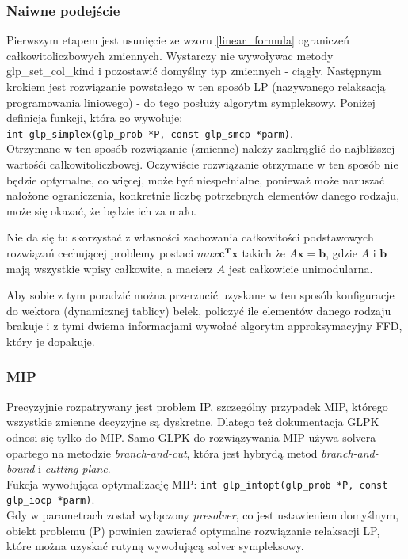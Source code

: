 \subsubsection{Naiwne podejście}
Pierwszym etapem jest usunięcie ze wzoru \ref{linear_formula} ograniczeń całkowitoliczbowych zmiennych. Wystarczy nie wywoływac metody glp\_set\_col\_kind i pozostawić domyślny typ zmiennych - ciągły. Następnym krokiem jest rozwiązanie powstałego w ten sposób LP (nazywanego relaksacją programowania liniowego) - do tego posłuży algorytm sympleksowy. Poniżej definicja funkcji, która go wywołuje:\\
\verb|int glp_simplex(glp_prob *P, const glp_smcp *parm)|. \\
Otrzymane w ten sposób rozwiązanie (zmienne) należy zaokrąglić do najbliższej wartośći całkowitoliczbowej. 
Oczywiście rozwiązanie otrzymane w ten sposób nie będzie optymalne, co więcej, może być niespełnialne, ponieważ może naruszać nałożone ograniczenia, konkretnie liczbę potrzebnych elementów danego rodzaju, może się okazać, że będzie ich za mało.

Nie da się tu skorzystać z własności zachowania całkowitości podstawowych rozwiązań cechującej problemy postaci $max \mathbf{c^Tx}$ takich że $A\mathbf{x = b}$, gdzie $A$ i $\mathbf{b}$ mają wszystkie wpisy całkowite, a macierz $A$ jest całkowicie unimodularna.

Aby sobie z tym poradzić można przerzucić uzyskane w ten sposób konfiguracje do wektora (dynamicznej tablicy) belek, policzyć ile elementów danego rodzaju brakuje i z tymi dwiema informacjami wywołać algorytm approksymacyjny FFD, który je dopakuje.

\subsubsection{MIP}
Precyzyjnie rozpatrywany jest problem IP, szczególny przypadek MIP, którego wszystkie zmienne decyzyjne są dyskretne.
Dlatego też dokumentacja GLPK odnosi się tylko do MIP. Samo GLPK do rozwiązywania MIP używa solvera opartego na metodzie \textit{branch-and-cut}, która jest hybrydą metod \textit{branch-and-bound} i \textit{cutting plane}. \\
Fukcja wywołująca optymalizację MIP: \verb|int glp_intopt(glp_prob *P, const glp_iocp *parm)|. \\
Gdy w parametrach został wyłączony \textit{presolver}, co jest ustawieniem domyślnym, obiekt problemu (P) powinien zawierać optymalne rozwiązanie relaksacji LP, które można uzyskać rutyną wywołującą solver sympleksowy.


